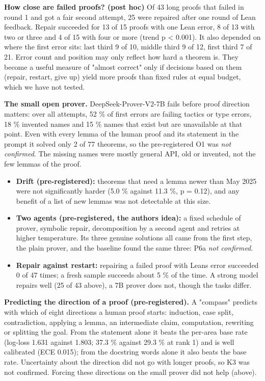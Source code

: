 \documentclass[11pt,a4paper]{article}
\providecommand{\tightlist}{\setlength{\itemsep}{0pt}\setlength{\parskip}{0pt}}
\begin{document}
\textbf{How close are failed proofs? (post hoc)} Of 43 long proofs that failed in round 1 and got a fair second attempt, 25 were repaired after one round of Lean feedback. Repair succeeded for 13 of 15 proofs with one Lean error, 8 of 13 with two or three and 4 of 15 with four or more (trend p \textless{} 0.001). It also depended on where the first error sits: last third 9 of 10, middle third 9 of 12, first third 7 of 21. Error count and position may only reflect how hard a theorem is. They become a useful measure of "almost correct" only if decisions based on them (repair, restart, give up) yield more proofs than fixed rules at equal budget, which we have not tested.

\textbf{The small open prover.} DeepSeek-Prover-V2-7B fails before proof direction matters: over all attempts, 52 \% of first errors are failing tactics or type errors, 18 \% invented names and 15 \% names that exist but are unavailable at that point. Even with every lemma of the human proof and its statement in the prompt it solved only 2 of 77 theorems, so the pre-registered O1 was \emph{not confirmed}. The missing names were mostly general API, old or invented, not the few lemmas of the proof.

\begin{itemize}
\tightlist
\item
  \textbf{Drift (pre-registered):} theorems that need a lemma newer than May 2025 were not significantly harder (5.0 \% against 11.3 \%, p = 0.12), and any benefit of a list of new lemmas was not detectable at this size.
\item
  \textbf{Two agents (pre-registered, the author\textquotesingle s idea):} a fixed schedule of prover, symbolic repair, decomposition by a second agent and retries at higher temperature. Its three genuine solutions all came from the first step, the plain prover, and the baseline found the same three: P6a \emph{not confirmed}.
\item
  \textbf{Repair against restart:} repairing a failed proof with Lean\textquotesingle s error succeeded 0 of 47 times; a fresh sample succeeds about 5 \% of the time. A strong model repairs well (25 of 43 above), a 7B prover does not, though the tasks differ.
\end{itemize}

\textbf{Predicting the direction of a proof (pre-registered).} A "compass" predicts with which of eight directions a human proof starts: induction, case split, contradiction, applying a lemma, an intermediate claim, computation, rewriting or splitting the goal. From the statement alone it beats the per-area base rate (log-loss 1.631 against 1.803; 37.3 \% against 29.3 \% at rank 1) and is well calibrated (ECE 0.015); from the docstring words alone it also beats the base rate. Uncertainty about the direction did not go with longer proofs, so K3 was not confirmed. Forcing these directions on the small prover did not help (above).
\end{document}
